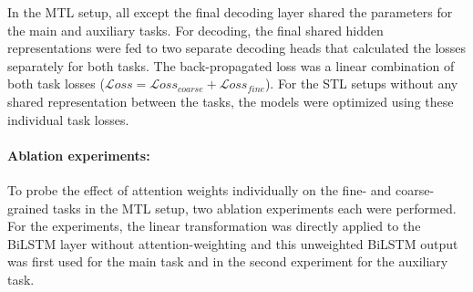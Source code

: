 \documentclass[runningheads]{llncs}
\begin{document}
In the MTL setup, all except the final decoding layer shared the parameters for the main and auxiliary tasks.
For decoding, the final shared hidden representations were fed to two separate decoding heads that calculated the losses separately for both tasks.
The back-propagated loss was a linear combination of both task losses ($\mathcal{L}oss = \mathcal{L}oss_{coarse} + \mathcal{L}oss_{fine}$).
For the STL setups without any shared representation between the tasks, the models were optimized using these individual task losses.
%
%
%
\paragraph{Ablation experiments: }
\label{subsec:ablation}
%
To probe the effect of attention weights individually on the fine- and coarse-grained tasks in the MTL setup, two ablation experiments each were performed.
For the experiments, the linear transformation was directly applied to the BiLSTM layer without attention-weighting and this unweighted BiLSTM output was first used for the main task and in the second experiment for the auxiliary task.
%
%
\end{document}

